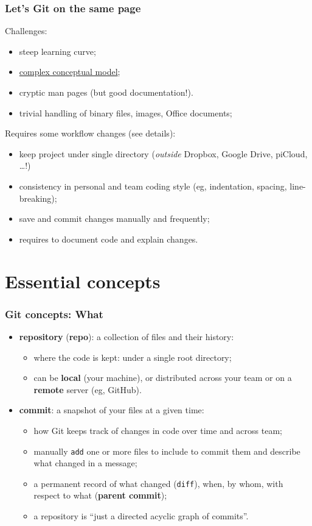 \documentclass[10pt,svgnames]{beamer}
\begin{document}
\begin{frame}
\frametitle{Let's Git on the same page}
\label{git_cons}

Challenges:
\begin{itemize}
  \item steep learning curve;
  \item \hyperlink{xkcd_git}{complex conceptual model};
  \item cryptic man pages (but good documentation!).
  \item trivial handling of binary files, images, Office documents;
\end{itemize}

\medskip
\pause 

Requires some workflow changes (\hypertarget{style}{see details}):
\begin{itemize}
  \item keep project under single directory (\emph{outside} Dropbox, Google Drive, piCloud, \ldots!)
  \item consistency in personal and team coding style (eg, indentation, spacing, line-breaking);
  \item save and commit changes manually and frequently;
  \item requires to document code and explain changes.
\end{itemize}
\end{frame}


\section{Essential concepts}
\begin{frame}
\frametitle{Git concepts: What}
    
\begin{itemize}[<+->]
\item \textbf{repository} (\textbf{repo}): a collection of files and their history:
\begin{itemize}
   \item where the code is kept: under a single root directory;
   \item can be \textbf{local} (your machine), or distributed across your team or on a \textbf{remote} server (eg, GitHub).
 \end{itemize}

\item \textbf{commit}: a snapshot of your files at a given time:
\begin{itemize}
  \item how Git keeps track of changes in code over time and across team;
  \item manually \lstinline{add} one or more files to include to commit them and describe what changed in a message;
  \item a permanent record of what changed (\lstinline{diff}), when, by whom, with respect to what (\textbf{parent commit});
  \item a repository is “just a directed acyclic graph of commits”.
\end{itemize}
\end{itemize}
\end{frame}
\end{document}
